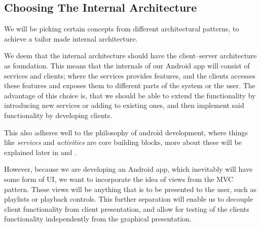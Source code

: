\subsection{Choosing The Internal Architecture}
We will be picking certain concepts from different architectural patterns, to achieve a tailor made internal architecture.

We deem that the internal architecture should have the client--server architecture as foundation.
This means that the internals of our Android app will consist of services and clients;
where the services provides features, and the clients accesses these features and exposes them to different parts of the system or the user.
The advantage of this choice is, that we should be able to extend the functionality by introducing new services or adding to existing ones, and then implement said functionality by developing clients.

This also adheres well to the philosophy of android development, where things like \textit{services} and \textit{activities} are core building blocks, more about these will be explained later in  and .

However, because we are developing an Android app, which inevitably will have some form of \ac{UI}, we want to incorporate the idea of views from the \ac{MVC} pattern.
These views will be anything that is to be presented to the user, such as playlists or playback controls.
This further separation will enable us to decouple client functionality from client presentation, and allow for testing of the clients functionality independently from the graphical presentation.
